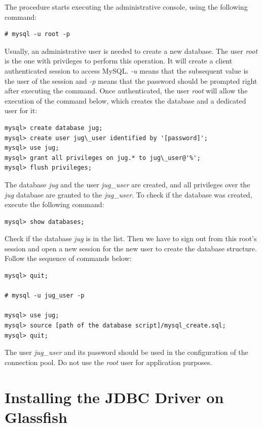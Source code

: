 \documentclass[envcountsame,envcountchap]{svmono}
\begin{document}
The procedure starts executing the administrative console, using the following command:

\begin{verbatim}
# mysql -u root -p
\end{verbatim}

Usually, an administrative user is needed to create a new database. The user \textit{root} is the one with privileges to perform this operation. It will create a client authenticated session to access MySQL. \textit{-u} means that the subsequent value is the user of the session and \textit{-p} means that the password should be prompted right after executing the command. Once authenticated, the user \textit{root} will allow the execution of the command below, which creates the database and a dedicated user for it:

\begin{verbatim}
mysql> create database jug;
mysql> create user jug\_user identified by '[password]';
mysql> use jug;
mysql> grant all privileges on jug.* to jug\_user@'%';
mysql> flush privileges;
\end{verbatim}

The database \textit{jug} and the user \textit{jug\_user} are created, and all privileges over the \textit{jug} database are granted to the \textit{jug\_user}. To check if the database was created, execute the following command:

\begin{verbatim}
mysql> show databases;
\end{verbatim}

Check if the database \textit{jug} is in the list. Then we have to sign out from this root's session and open a new session for the new user to create the database structure. Follow the sequence of commands below:

\begin{verbatim}
mysql> quit;

# mysql -u jug_user -p

mysql> use jug;
mysql> source [path of the database script]/mysql_create.sql;
mysql> quit;
\end{verbatim}

The user \textit{jug\_user} and its password should be used in the configuration of the connection pool. Do not use the \textit{root} user for application purposes.

\section{Installing the JDBC Driver on Glassfish}
\end{document}
